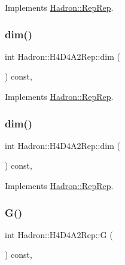 Implements \mbox{\hyperlink{structHadron_1_1RepRep_a92c8802e5ed7afd7da43ccfd5b7cd92b}{Hadron\+::\+Rep\+Rep}}.

\mbox{\label{structHadron_1_1H4D4A2Rep_a6a4d1d831d61b10d0a66706229a04198}} 
\subsubsection{\texorpdfstring{dim()}{dim()}\hspace{0.1cm}{\footnotesize\ttfamily [2/3]}}
{\footnotesize\ttfamily int Hadron\+::\+H4\+D4\+A2\+Rep\+::dim (\begin{DoxyParamCaption}{ }\end{DoxyParamCaption}) const\hspace{0.3cm}{\ttfamily [inline]}, {\ttfamily [virtual]}}



Implements \mbox{\hyperlink{structHadron_1_1RepRep_a92c8802e5ed7afd7da43ccfd5b7cd92b}{Hadron\+::\+Rep\+Rep}}.

\mbox{\label{structHadron_1_1H4D4A2Rep_a6a4d1d831d61b10d0a66706229a04198}} 
\subsubsection{\texorpdfstring{dim()}{dim()}\hspace{0.1cm}{\footnotesize\ttfamily [3/3]}}
{\footnotesize\ttfamily int Hadron\+::\+H4\+D4\+A2\+Rep\+::dim (\begin{DoxyParamCaption}{ }\end{DoxyParamCaption}) const\hspace{0.3cm}{\ttfamily [inline]}, {\ttfamily [virtual]}}



Implements \mbox{\hyperlink{structHadron_1_1RepRep_a92c8802e5ed7afd7da43ccfd5b7cd92b}{Hadron\+::\+Rep\+Rep}}.

\mbox{\label{structHadron_1_1H4D4A2Rep_add691ecf1c27769c705c534dcf292602}} 
\subsubsection{\texorpdfstring{G()}{G()}\hspace{0.1cm}{\footnotesize\ttfamily [1/2]}}
{\footnotesize\ttfamily int Hadron\+::\+H4\+D4\+A2\+Rep\+::G (\begin{DoxyParamCaption}{ }\end{DoxyParamCaption}) const\hspace{0.3cm}{\ttfamily [inline]}, {\ttfamily [virtual]}}


